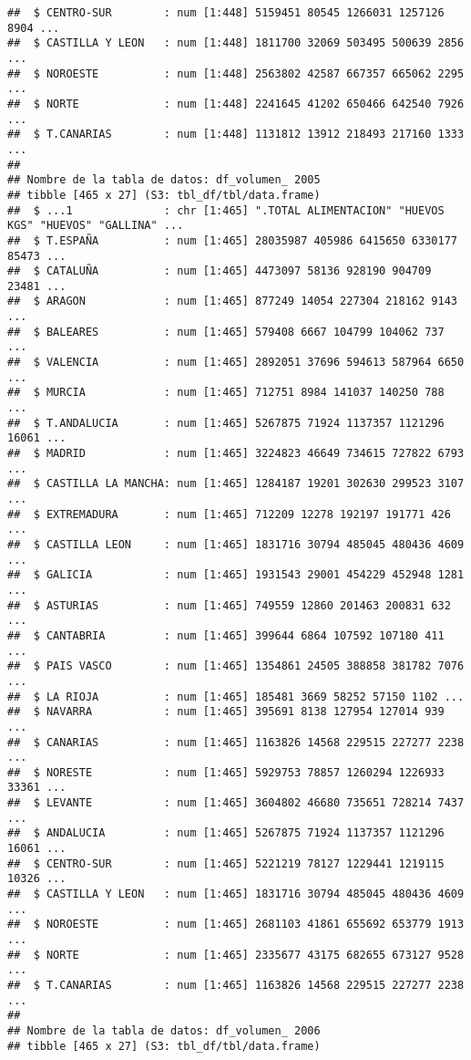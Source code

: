 \documentclass[
]{article}
\begin{document}
\begin{verbatim}
##  $ CENTRO-SUR        : num [1:448] 5159451 80545 1266031 1257126 8904 ...
##  $ CASTILLA Y LEON   : num [1:448] 1811700 32069 503495 500639 2856 ...
##  $ NOROESTE          : num [1:448] 2563802 42587 667357 665062 2295 ...
##  $ NORTE             : num [1:448] 2241645 41202 650466 642540 7926 ...
##  $ T.CANARIAS        : num [1:448] 1131812 13912 218493 217160 1333 ...
##  
## Nombre de la tabla de datos: df_volumen_ 2005 
## tibble [465 x 27] (S3: tbl_df/tbl/data.frame)
##  $ ...1              : chr [1:465] ".TOTAL ALIMENTACION" "HUEVOS KGS" "HUEVOS" "GALLINA" ...
##  $ T.ESPAÑA          : num [1:465] 28035987 405986 6415650 6330177 85473 ...
##  $ CATALUÑA          : num [1:465] 4473097 58136 928190 904709 23481 ...
##  $ ARAGON            : num [1:465] 877249 14054 227304 218162 9143 ...
##  $ BALEARES          : num [1:465] 579408 6667 104799 104062 737 ...
##  $ VALENCIA          : num [1:465] 2892051 37696 594613 587964 6650 ...
##  $ MURCIA            : num [1:465] 712751 8984 141037 140250 788 ...
##  $ T.ANDALUCIA       : num [1:465] 5267875 71924 1137357 1121296 16061 ...
##  $ MADRID            : num [1:465] 3224823 46649 734615 727822 6793 ...
##  $ CASTILLA LA MANCHA: num [1:465] 1284187 19201 302630 299523 3107 ...
##  $ EXTREMADURA       : num [1:465] 712209 12278 192197 191771 426 ...
##  $ CASTILLA LEON     : num [1:465] 1831716 30794 485045 480436 4609 ...
##  $ GALICIA           : num [1:465] 1931543 29001 454229 452948 1281 ...
##  $ ASTURIAS          : num [1:465] 749559 12860 201463 200831 632 ...
##  $ CANTABRIA         : num [1:465] 399644 6864 107592 107180 411 ...
##  $ PAIS VASCO        : num [1:465] 1354861 24505 388858 381782 7076 ...
##  $ LA RIOJA          : num [1:465] 185481 3669 58252 57150 1102 ...
##  $ NAVARRA           : num [1:465] 395691 8138 127954 127014 939 ...
##  $ CANARIAS          : num [1:465] 1163826 14568 229515 227277 2238 ...
##  $ NORESTE           : num [1:465] 5929753 78857 1260294 1226933 33361 ...
##  $ LEVANTE           : num [1:465] 3604802 46680 735651 728214 7437 ...
##  $ ANDALUCIA         : num [1:465] 5267875 71924 1137357 1121296 16061 ...
##  $ CENTRO-SUR        : num [1:465] 5221219 78127 1229441 1219115 10326 ...
##  $ CASTILLA Y LEON   : num [1:465] 1831716 30794 485045 480436 4609 ...
##  $ NOROESTE          : num [1:465] 2681103 41861 655692 653779 1913 ...
##  $ NORTE             : num [1:465] 2335677 43175 682655 673127 9528 ...
##  $ T.CANARIAS        : num [1:465] 1163826 14568 229515 227277 2238 ...
##  
## Nombre de la tabla de datos: df_volumen_ 2006 
## tibble [465 x 27] (S3: tbl_df/tbl/data.frame)

\end{verbatim}
\end{document}
